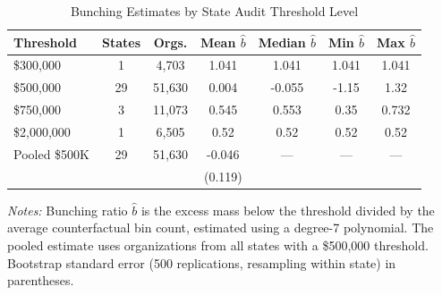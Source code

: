 \begin{table}[t]
\centering
\caption{Bunching Estimates by State Audit Threshold Level}
\label{tab:bunching_by_threshold}
\begin{tabular}{lcccccc}
\hline\hline
Threshold & States & Orgs. & Mean $\hat{b}$ & Median $\hat{b}$ & Min $\hat{b}$ & Max $\hat{b}$ \\
\hline
\$300,000 & 1 & 4,703 & 1.041 & 1.041 & 1.041 & 1.041 \\
\$500,000 & 29 & 51,630 & 0.004 & -0.055 & -1.15 & 1.32 \\
\$750,000 & 3 & 11,073 & 0.545 & 0.553 & 0.35 & 0.732 \\
\$2,000,000 & 1 & 6,505 & 0.52 & 0.52 & 0.52 & 0.52 \\
\hline
Pooled \$500K & 29 & 51,630 & -0.046 & --- & --- & --- \\
 & & & (0.119) & & & \\
\hline\hline
\end{tabular}
\begin{tablenotes}[flushleft]
\small
\item \textit{Notes:} Bunching ratio $\hat{b}$ is the excess mass below the threshold divided by the average counterfactual bin count, estimated using a degree-7 polynomial. The pooled estimate uses organizations from all states with a \$500,000 threshold. Bootstrap standard error (500 replications, resampling within state) in parentheses.
\end{tablenotes}
\end{table}
